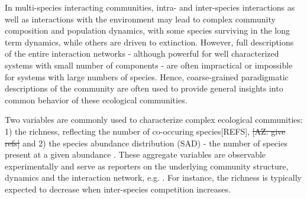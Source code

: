 \documentclass[9pt,twocolumn,twoside,lineno]{pnas-new}
\begin{document}
In multi-species interacting communities,  intra- and inter-species interactions as well as interactions with the environment may lead to complex community composition and population dynamics, with some species surviving in the long term dynamics, while others are driven to extinction.
However, full descriptions of the entire interaction networks - although powerful for well characterized systems with small number of components - are often impractical or impossible for systems with large numbers of species. 
Hence, coarse-grained paradigmatic descriptions of the community are often used to provide general insights into common behavior of these ecological communities.

Two variables are commonly used to characterize complex ecological communities: 1) the richness, reflecting the number of co-occuring species\cite{capitan2017stochastic}[REFS], \st{[AZ: give refs]} and 2) the species abundance distribution (SAD) - the number of species present at a given abundance \cite{nias1968clone, rulands2018universality, de2020naive, mcgill2007species, matthews2015species}. %
These aggregate variables are observable experimentally and serve as reporters on the underlying community structure, dynamics and the interaction network, e.g. \cite{rahbek2001multiscale,hong2006predicting,adler2011productivity,valencia2020synchrony}. 
For instance, the richness is typically expected to decrease when inter-species competition increases\cite{capitan2017stochastic}. 
\end{document}
